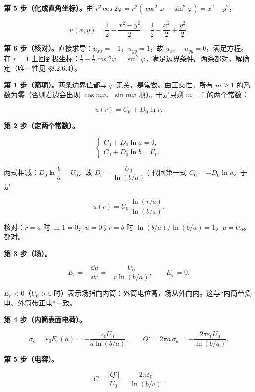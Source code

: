 \textbf{第 5 步（化成直角坐标）。}由 $r^2\cos2\varphi=r^2(\cos^2\varphi-\sin^2\varphi)=x^2-y^2$，

\[
u(x,y)=\frac12-\frac{x^2-y^2}{2}=\frac12-\frac{x^2}{2}+\frac{y^2}{2}.
\]

\textbf{第 6 步（核对）。}直接求导：$u_{xx}=-1$，$u_{yy}=1$，故 $u_{xx}+u_{yy}=0$，满足方程。在 $r=1$ 上回到极坐标：$\frac12-\frac12\cos2\varphi=\sin^2\varphi$，满足边界条件。两条都对，解确定（唯一性见 \S8.2.6.4）。



\textbf{第 1 步（筛项）。}两条边界值都与 $\varphi$ 无关，是常数。由正交性，所有 $m\ge1$ 的系数为零（否则右边会出现 $\cos m\varphi$、$\sin m\varphi$ 项）。于是只剩 $m=0$ 的两个常数：

\[
u(r)=C_0+D_0\ln r .
\]

\textbf{第 2 步（定两个常数）。}

\[
\begin{cases}
C_0+D_0\ln a=0,\\[2pt]
C_0+D_0\ln b=U_0 .
\end{cases}
\]

两式相减：$D_0\ln\dfrac{b}{a}=U_0$，故 $D_0=\dfrac{U_0}{\ln(b/a)}$；代回第一式 $C_0=-D_0\ln a$。于是

\[
u(r)=U_0\,\frac{\ln(r/a)}{\ln(b/a)} .
\]

核对：$r=a$ 时 $\ln1=0$，$u=0$；$r=b$ 时 $\ln(b/a)/\ln(b/a)=1$，$u=U_0$。都对。

\textbf{第 3 步（场）。}

\[
E_r=-\frac{\dd u}{\dd r}=-\frac{U_0}{r\ln(b/a)},\qquad E_\varphi=0 .
\]

$E_r<0$（$U_0>0$ 时）表示场指向内筒：外筒电位高，场从外向内。这与“内筒带负电、外筒带正电”一致。

\textbf{第 4 步（内筒表面电荷）。}

\[
\sigma_a=\varepsilon_0E_r(a)=-\frac{\varepsilon_0U_0}{a\ln(b/a)},\qquad
Q'=2\pi a\,\sigma_a=-\frac{2\pi\varepsilon_0U_0}{\ln(b/a)} .
\]

\textbf{第 5 步（电容）。}

\[
C=\frac{|Q'|}{U_0}=\frac{2\pi\varepsilon_0}{\ln(b/a)} .
\]

